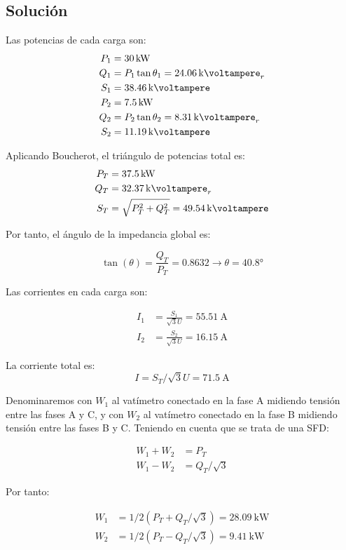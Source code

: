 \subsection*{Solución}

 Las potencias de cada carga son:
 \begin{align*}
   P_1 &= \SI{30}{\kilo\watt}\\
   Q_1 &= P_1\tan \theta_1 = \SI{24.06}{\kilo\voltampere}_r\\
   S_1 &= \SI{38.46}{\kilo\voltampere}\\
   P_2 &= \SI{7.5}{\kilo\watt}\\
   Q_2 &= P_2 \tan \theta_2 = \SI{8.31}{\kilo\voltampere}_r\\
   S_2 &= \SI{11.19}{\kilo\voltampere}
 \end{align*}

 Aplicando Boucherot, el triángulo de potencias total es:
 \begin{align*}
   P_T &= \SI{37.5}{\kilo\watt}\\
   Q_T &= \SI{32.37}{\kilo\voltampere}_r\\
   S_T &= \sqrt{P_T^2 + Q_T^2} = \SI{49.54}{\kilo\voltampere}
 \end{align*}

 Por tanto, el ángulo de la impedancia global es:

\[
  \tan(\theta) = \frac{Q_T}{P_T} = 0.8632 \rightarrow \theta =
  \ang{40.8}
\]

Las corrientes en cada carga son:

\begin{align*}
  I_1 &= \frac{S_1}{\sqrt{3} U} = \SI{55.51}{\ampere}\\
  I_2 &= \frac{S_2}{\sqrt{3} U} = \SI{16.15}{\ampere}
\end{align*}

La corriente total es:
\[
  I = S_T /{\sqrt{3} U} = \SI{71.5}{\ampere}
\]

Denominaremos con $W_1$ al vatímetro conectado en la fase A midiendo
tensión entre las fases A y C, y con $W_2$ al vatímetro conectado en
la fase B midiendo tensión entre las fases B y C. Teniendo en cuenta
que se trata de una SFD:
 
\begin{align*}
  W_1 + W_2 &= P_T\\
  W_1 - W_2 &= Q_T/\sqrt{3}
\end{align*}

Por tanto:

\begin{align*}
  W_1 &= 1/2 (P_T + Q_T/\sqrt{3}) = \SI{28.09}{\kilo\watt}\\
  W_2 &= 1/2 (P_T - Q_T/\sqrt{3}) = \SI{9.41}{\kilo\watt}
\end{align*}

